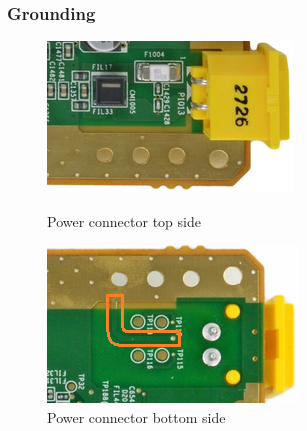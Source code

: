 \documentclass[11pt,a4paper,titlepage]{article}
\begin{document}
		\subsubsection{Grounding}
		  \begin{figure}[h]
				\begin{minipage}{.47 \textwidth}
				  \includegraphics[width = .95\textwidth]{power_connector_top.png}
				  \caption{Power connector top side}
				  \label{fig:powertop}
				\end{minipage}
				\vspace{5mm}
				\begin{minipage}{.47 \textwidth}
				  \includegraphics[width = .95\textwidth]{power_connector_bottom.png}
				  \caption{Power connector bottom side}
				  \label{fig:powerbottom}
				\end{minipage}
		  \end{figure}
\end{document}
